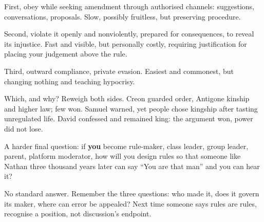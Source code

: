 First, obey while seeking amendment through authorised channels: suggestions, conversations, proposals. Slow, possibly fruitless, but preserving procedure.

Second, violate it openly and nonviolently, prepared for consequences, to reveal its injustice. Fast and visible, but personally costly, requiring justification for placing your judgement above the rule.

Third, outward compliance, private evasion. Easiest and commonest, but changing nothing and teaching hypocrisy.

Which, and why? Reweigh both sides. Creon guarded order, Antigone kinship and higher law; few won. Samuel warned, yet people chose kingship after tasting unregulated life. David confessed and remained king: the argument won, power did not lose.

A harder final question: if \textbf{you} become rule-maker, class leader, group leader, parent, platform moderator, how will you design rules so that someone like Nathan three thousand years later can say ``You are that man'' and you can hear it?

No standard answer. Remember the three questions: who made it, does it govern its maker, where can error be appealed? Next time someone says rules are rules, recognise a position, not discussion's endpoint.
